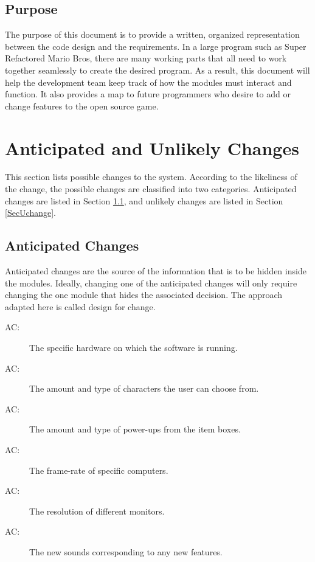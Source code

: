 \documentclass[12pt, titlepage]{article}
\newcounter{acnum}
\newcommand{\actheacnum}{AC\theacnum}
\begin{document}
\subsection{Purpose}

The purpose of this document is to provide a written, organized representation between the code design and the requirements. In a large program such as Super Refactored Mario Bros, there are many working parts that all need to work together seamlessly to create the desired program. As a result, this document will help the development team keep track of how the modules must interact and function. It also provides a map to future programmers who desire to add or change features to the open source game.

\section{Anticipated and Unlikely Changes} \label{SecChange}

This section lists possible changes to the system. According to the likeliness
of the change, the possible changes are classified into two
categories. Anticipated changes are listed in Section \ref{SecAchange}, and
unlikely changes are listed in Section \ref{SecUchange}.

\subsection{Anticipated Changes} \label{SecAchange}

Anticipated changes are the source of the information that is to be hidden
inside the modules. Ideally, changing one of the anticipated changes will only
require changing the one module that hides the associated decision. The approach
adapted here is called design for
change.

\begin{description}
\item[ \actheacnum \label{acHardware}:] The specific hardware on which the software is running.
\item[ \actheacnum \label{acCharacters}:] The amount and type of characters the user can choose from. 
\item[ \actheacnum \label{acPower}:] The amount and type of power-ups from the item boxes.
\item[ \actheacnum \label{acSpeed}:] The frame-rate of specific computers.
\item[ \actheacnum \label{acRes}:] The resolution of different monitors.
\item[ \actheacnum \label{acSound}:] The new sounds corresponding to any new features.
\end{description}
\end{document}
